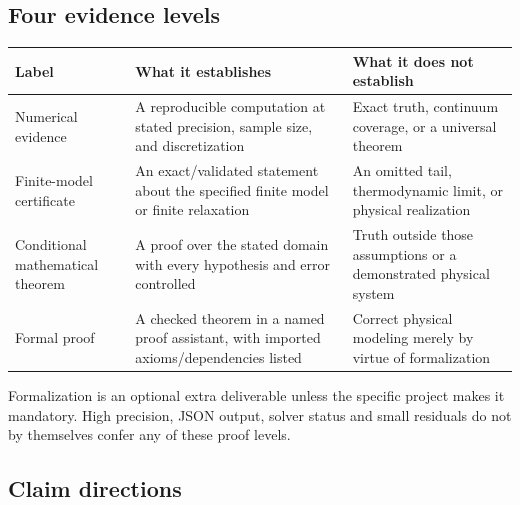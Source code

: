 \documentclass[
  11pt,
]{article}
\newcounter{none} %
\begin{document}
\subsection{Four evidence levels}

{\def\LTcaptype{none} %
\begin{longtable}[]{@{}
  >{\raggedright\arraybackslash}p{}
  >{\raggedright\arraybackslash}p{}
  >{\raggedright\arraybackslash}p{}@{}}
\toprule\noalign{}
\begin{minipage}[b]{\linewidth}\raggedright
Label
\end{minipage} & \begin{minipage}[b]{\linewidth}\raggedright
What it establishes
\end{minipage} & \begin{minipage}[b]{\linewidth}\raggedright
What it does not establish
\end{minipage} \\
\midrule\noalign{}
\endhead
\bottomrule\noalign{}
\endlastfoot
Numerical evidence & A reproducible computation at stated precision,
sample size, and discretization & Exact truth, continuum coverage, or a
universal theorem \\
Finite-model certificate & An exact/validated statement about the
specified finite model or finite relaxation & An omitted tail,
thermodynamic limit, or physical realization \\
Conditional mathematical theorem & A proof over the stated domain with
every hypothesis and error controlled & Truth outside those assumptions
or a demonstrated physical system \\
Formal proof & A checked theorem in a named proof assistant, with
imported axioms/dependencies listed & Correct physical modeling merely
by virtue of formalization \\
\end{longtable}
}

Formalization is an optional extra deliverable unless the specific
project makes it mandatory. High precision, JSON output, solver status
and small residuals do not by themselves confer any of these proof
levels.

\subsection{Claim directions}
\end{document}
